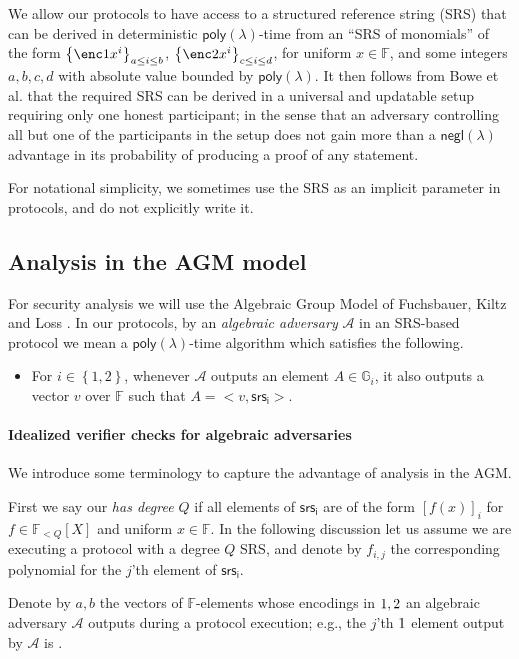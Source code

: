 \documentclass[11pt]{article} %
\newcommand{\Gi}{\ensuremath{{\mathbb G}_i}\xspace}
\newcommand{\F}{\ensuremath{\mathbb F}\xspace}
\newcommand{\adv}{\ensuremath{\mathcal A}\xspace}
\newcommand{\srsi}{\ensuremath{\mathsf{srs_i}}\xspace}
\newcommand{\negl}{\ensuremath{\mathsf{negl}(\lambda)}\xspace}
\newcommand{\sett}[2]{\ensuremath{\set{#1}_{#2}}\xspace}
\newcommand{\enci}[1]{\ensuremath{\left[#1\right]_i}\xspace}
\newcommand{\set}[1]{\ensuremath{\left\{#1\right\}}\xspace}
\newcommand{\polysofdeg}[1]{\ensuremath{\F_{< #1}[X]}\xspace}
\newcommand{\poly}{\ensuremath{\mathsf{poly(\lambda)}}\xspace}
\begin{document}
We allow our protocols to have access to a structured reference string (SRS) that can be derived in deterministic \poly-time from an ``SRS of monomials'' of the form
\sett{\enc1{x^i}}{a\leq i \leq b}, \sett{\enc2{x^i}}{c\leq i \leq d}, for uniform $x\in \F$,
and some integers $a,b,c,d$ with absolute value bounded by \poly.
It then follows from Bowe et al. \cite{SecondMPC} that the required SRS can be derived in a universal and updatable setup requiring only one honest participant; in the sense that an adversary controlling all but one of the participants in the setup does not gain more than a \negl advantage in its probability of producing a proof of any statement.

For notational simplicity, we sometimes use the SRS  as an implicit parameter in protocols, and do not explicitly write it.

\subsection{Analysis in the AGM model}\label{subsec:AGM}
For security analysis we will use the Algebraic Group Model of Fuchsbauer, Kiltz and Loss \cite{AGM}.
In our protocols, by an \emph{algebraic adversary} \adv in an SRS-based protocol we mean a \poly-time algorithm which satisfies the following.
\begin{itemize}
 \item For $i\in \set{1,2}$, whenever \adv outputs an element $A\in \Gi$, it also outputs a vector $v$ over \F such that $A = <v,\srsi>$.
\end{itemize}

\paragraph{Idealized verifier checks for algebraic adversaries}
We introduce some terminology to capture the advantage of analysis in the AGM.

First we say our  \emph{has degree $Q$} if all elements of \srsi are of the form  \enci{f(x)} for $f\in \polysofdeg{Q}$ and uniform $x\in \F$. In the following discussion let us assume we are executing a protocol with a degree $Q$ SRS, and denote by $f_{i,j}$ the corresponding polynomial for the $j$'th element of \srsi.

Denote by $a,b$ the vectors of $\F$-elements whose encodings in $\G1,\G2$ an algebraic adversary \adv outputs during a protocol execution; e.g., the $j$'th $\G1$ element output by \adv is .
\end{document}
